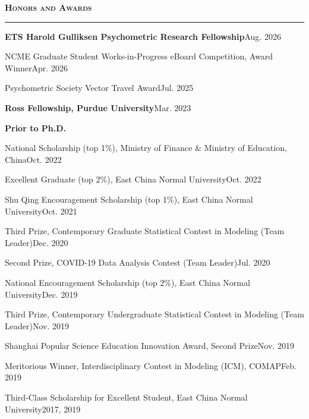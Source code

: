 \documentclass[10.5pt,letterpaper]{article}
\renewcommand{\section}[1]{%
  \needspace{3\baselineskip}\vspace{12pt}\par
  {\fontsize{13.5}{16}\selectfont\bfseries\scshape\color{accent}#1}\hspace{6pt}%
  {\color{accent}\leaders\hrule height 0.8pt\hfill\kern0pt}\par\vspace{6pt}}
\newcommand{\row}[2]{\needspace{1\baselineskip}#1\hfill#2\par\vspace{2pt}}
\begin{document}
\section{Honors and Awards}
\row{\textbf{ETS Harold Gulliksen Psychometric Research Fellowship}}{Aug. 2026}
\row{NCME Graduate Student Works-in-Progress eBoard Competition, Award Winner}{Apr. 2026}
\row{Psychometric Society Vector Travel Award}{Jul. 2025}
\row{\textbf{Ross Fellowship, Purdue University}}{Mar. 2023}
\vspace{4pt}
{\color{textdark}\textbf{Prior to Ph.D.}}\par\vspace{2pt}
\row{National Scholarship (top 1\%), Ministry of Finance \& Ministry of Education, China}{Oct. 2022}
\row{Excellent Graduate (top 2\%), East China Normal University}{Oct. 2022}
\row{Shu Qing Encouragement Scholarship (top 1\%), East China Normal University}{Oct. 2021}
\row{Third Prize, Contemporary Graduate Statistical Contest in Modeling (Team Leader)}{Dec. 2020}
\row{Second Prize, COVID-19 Data Analysis Contest (Team Leader)}{Jul. 2020}
\row{National Encouragement Scholarship (top 2\%), East China Normal University}{Dec. 2019}
\row{Third Prize, Contemporary Undergraduate Statistical Contest in Modeling (Team Leader)}{Nov. 2019}
\row{Shanghai Popular Science Education Innovation Award, Second Prize}{Nov. 2019}
\row{Meritorious Winner, Interdisciplinary Contest in Modeling (ICM), COMAP}{Feb. 2019}
\row{Third-Class Scholarship for Excellent Student, East China Normal University}{2017, 2019}

\end{document}
